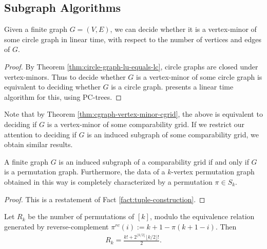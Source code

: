\subsection{Subgraph Algorithms}
\label{sec:subgraph-vertex-minor-alg}

\begin{fact}
Given a finite graph $G = (V,E)$, we can decide whether it is a vertex-minor of some circle graph in linear time, with respect to the number of vertices and edges of $G$.
\end{fact}

\begin{proof}
By Theorem \ref{thm:circle-graph-lu-equals-lc}, circle graphs are closed under vertex-minors. Thus to decide whether $G$ is a vertex-minor of some circle graph is equivalent to deciding whether $G$ is a circle graph. \cite{paul2025circlegraphsrecognizedlinear} presents a linear time algorithm for this, using PC-trees.
\end{proof}

Note that by Theorem \ref{thm:cgraph-vertex-minor-cgrid}, the above is equivalent to deciding if $G$ is a vertex-minor of some comparability grid. If we restrict our attention to deciding if $G$ is an induced subgraph of some comparability grid, we obtain similar results.

\begin{fact}
\label{fact:perm-graph-iff-subgraph-cgrid}
A finite graph $G$ is an induced subgraph of a comparability grid if and only if $G$ is a permutation graph. Furthermore, the data of a $k$-vertex permutation graph obtained in this way is completely characterized by a permutation $\pi \in S_k$.
\end{fact}

\begin{proof}
This is a restatement of Fact \ref{fact:tuple-construction}.
\end{proof}

\begin{lemma}
\label{lemma:permutations-mod-reverse-complement}
Let \(R_k\) be the number of permutations of \([k]\), modulo the equivalence
relation generated by reverse-complement
$
    \pi^{rc}(i) := k+1-\pi(k+1-i)
$.
Then
\begin{align}
    R_k
    =
    \frac{k!+2^{\lfloor k/2\rfloor}\lfloor k/2\rfloor!}{2}.
\end{align}
\end{lemma}

